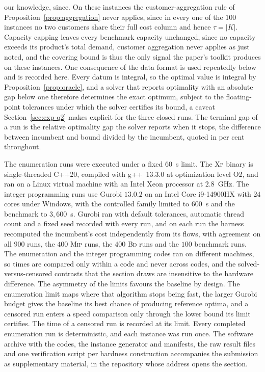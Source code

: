 our knowledge, since. On these instances the customer-aggregation rule of
Proposition~\ref{prop:aggregation} never applies, since in every one of
the $100$ instances no two customers share their full cost column and
hence $\tau=|K|$. Capacity capping leaves every benchmark capacity
unchanged, since no capacity exceeds its product's total demand,
customer aggregation never applies as just noted, and the covering
bound is thus the only signal the paper's toolkit produces on these
instances. One consequence of the data format is used repeatedly
below and is recorded here. Every
datum is integral, so the optimal value is integral by
Proposition~\ref{prop:oracle}, and a solver that reports optimality with
an absolute gap below one therefore determines the exact optimum,
subject to the floating-point tolerances under which the solver
certifies its bound, a caveat Section~\ref{sec:exp-q2} makes explicit
for the three closed runs. The
terminal gap of a run is the relative optimality gap the solver reports
when it stops, the difference between incumbent and bound divided by the
incumbent, quoted in per cent throughout.

The enumeration runs were executed under a fixed $60$~s limit. The
\textsc{Xp} binary is single-threaded C++20, compiled with g++~13.3.0 at
optimization level O2, and ran on a Linux virtual machine with an Intel
Xeon processor at $2.8$~GHz.
The integer programming runs use Gurobi $13.0.2$ on an Intel Core i9-14900HX
with $24$ cores under Windows, with the controlled family limited to $600$~s
and the benchmark to $3{,}600$~s. Gurobi ran with default tolerances,
automatic thread count and a fixed seed recorded with every run, and on
each run the harness recomputed the incumbent's cost independently from
its flows, with agreement on all $900$ runs, the $400$ \textsc{Mip} runs, the
$400$ \textsc{Bd} runs and the $100$ benchmark runs. The enumeration and the
integer programming codes ran on different machines, so times are
compared only within a code and never across codes, and the
solved-versus-censored contrasts that the section draws are insensitive
to the hardware difference. The asymmetry of the limits favours the
baseline by
design. The enumeration limit maps where that algorithm stops being fast, the
larger Gurobi budget gives the baseline its best chance of producing
reference optima, and a censored run enters a speed comparison only
through the lower bound its limit certifies. The time of a censored run
is recorded at its limit. Every completed enumeration run is
deterministic, and each instance was run once. The software archive with
the codes, the instance generator and manifests, the raw result files and
one verification script per hardness construction accompanies the
submission as supplementary material, in the repository whose address
opens the section.


